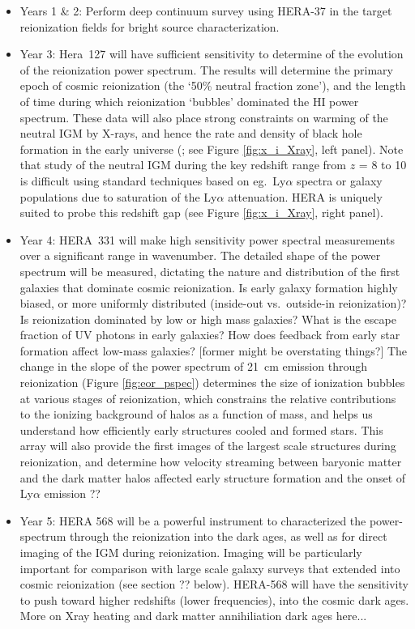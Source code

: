 \documentclass[preprint]{aastex}
\begin{document}
\begin{itemize}

\item Years 1 \& 2: Perform deep continuum survey using HERA-37 in the target reionization fields for bright source characterization. 

\item Year 3: Hera~127 will have sufficient sensitivity to determine of the evolution of the reionization power spectrum. The results will determine the primary epoch of cosmic reionization (the `50\% neutral fraction zone'), and the length of time during which reionization `bubbles' dominated the HI power spectrum. These data will also place strong constraints on warming of the neutral IGM by X-rays, and hence the rate and density of black hole formation in the
early universe (\citealt{pritchard_XXX}; see Figure \ref{fig:x_i_Xray}, left panel). Note that study of the neutral IGM during the key redshift range from $z$ = 8 to 10 is difficult using standard techniques based on eg.\ Ly$\alpha$ spectra or galaxy populations due to saturation of the Ly$\alpha$ attenuation. HERA is uniquely suited to probe this redshift gap (see Figure \ref{fig:x_i_Xray}, right panel). 

\item Year 4: HERA~331 will make high sensitivity power spectral measurements over a significant range in wavenumber. The detailed shape of the power spectrum will be measured, dictating the nature and distribution of the first galaxies that dominate cosmic  reionization. Is early galaxy formation highly biased, or more uniformly distributed (inside-out vs.\ outside-in reionization)? Is reionization dominated by low or high mass galaxies? What is the escape fraction of UV photons in early galaxies? How does feedback from early star formation affect low-mass galaxies? [former might be overstating things?] The change in the slope of the power spectrum of 21~cm emission through reionization (Figure \ref{fig:eor_pspec}) determines the size of ionization bubbles at various stages of reionization, which constrains the relative contributions to the ionizing background of halos as a function of mass, and helps us understand how efficiently early structures cooled and formed stars. This array will also provide the first images of the largest scale structures during reionization, and determine how velocity streaming between baryonic  matter and the dark matter halos affected early structure formation and the onset of Ly$\alpha$ emission \citep{visbal_et_al2012}??

\item Year 5: HERA 568 will be a powerful instrument to characterized the power-spectrum through the reionization into the dark ages, as well as for direct imaging of the IGM during reionization. Imaging will be particularly important for comparison with large scale galaxy surveys that extended into cosmic reionization (see section ?? below). HERA-568 will have the sensitivity to push toward higher redshifts (lower frequencies), into the cosmic dark ages. More on Xray heating and dark matter annihiliation dark ages here...

\end{itemize}
\end{document}
